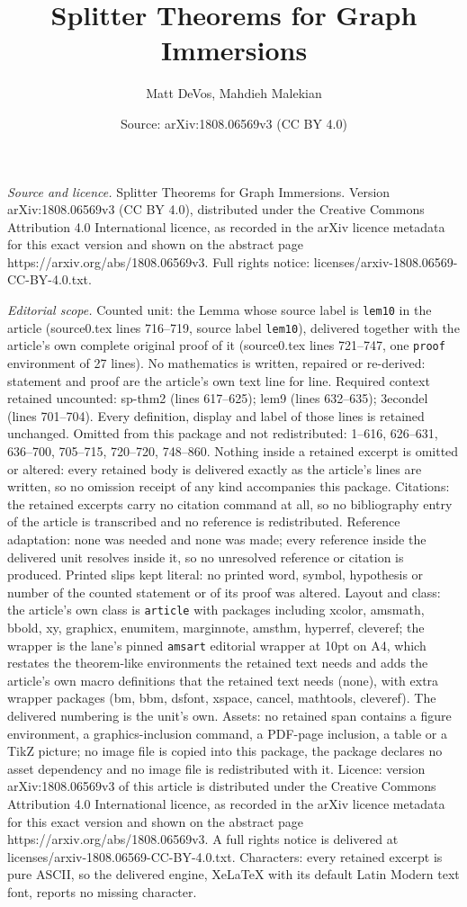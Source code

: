 \documentclass[10pt,a4paper]{amsart}
\title[Splitter Theorems for Graph Immersions]{Splitter Theorems for Graph Immersions}
\author{Matt DeVos, Mahdieh Malekian}
\date{Source: arXiv:1808.06569v3 (CC BY 4.0)}
\begin{document}
\maketitle

\noindent\emph{Source and licence.} Splitter Theorems for Graph Immersions. Version arXiv:1808.06569v3 (CC BY 4.0), distributed under the Creative Commons Attribution 4.0 International licence, as recorded in the arXiv licence metadata for this exact version and shown on the abstract page https://arxiv.org/abs/1808.06569v3. Full rights notice: licenses/arxiv-1808.06569-CC-BY-4.0.txt.\par\smallskip

\noindent\textit{Editorial scope.} Counted unit: the Lemma whose source label is \texttt{lem10} in the article (source0.tex lines 716--719, source label \texttt{lem10}), delivered together with the article's own complete original proof of it (source0.tex lines 721--747, one \texttt{proof} environment of 27 lines). No mathematics is written, repaired or re-derived: statement and proof are the article's own text line for line. Required context retained uncounted: sp-thm2 (lines 617--625); lem9 (lines 632--635); 3econdel (lines 701--704). Every definition, display and label of those lines is retained unchanged. Omitted from this package and not redistributed: 1--616, 626--631, 636--700, 705--715, 720--720, 748--860. Nothing inside a retained excerpt is omitted or altered: every retained body is delivered exactly as the article's lines are written, so no omission receipt of any kind accompanies this package. Citations: the retained excerpts carry no citation command at all, so no bibliography entry of the article is transcribed and no reference is redistributed. Reference adaptation: none was needed and none was made; every reference inside the delivered unit resolves inside it, so no unresolved reference or citation is produced. Printed slips kept literal: no printed word, symbol, hypothesis or number of the counted statement or of its proof was altered. Layout and class: the article's own class is \texttt{article} with packages including xcolor, amsmath, bbold, xy, graphicx, enumitem, marginnote, amsthm, hyperref, cleveref; the wrapper is the lane's pinned \texttt{amsart} editorial wrapper at 10pt on A4, which restates the theorem-like environments the retained text needs and adds the article's own macro definitions that the retained text needs (none), with extra wrapper packages (bm, bbm, dsfont, xspace, cancel, mathtools, cleveref). The delivered numbering is the unit's own. Assets: no retained span contains a figure environment, a graphics-inclusion command, a PDF-page inclusion, a table or a TikZ picture; no image file is copied into this package, the package declares no asset dependency and no image file is redistributed with it. Licence: version arXiv:1808.06569v3 of this article is distributed under the Creative Commons Attribution 4.0 International licence, as recorded in the arXiv licence metadata for this exact version and shown on the abstract page https://arxiv.org/abs/1808.06569v3. A full rights notice is delivered at licenses/arxiv-1808.06569-CC-BY-4.0.txt. Characters: every retained excerpt is pure ASCII, so the delivered engine, XeLaTeX with its default Latin Modern text font, reports no missing character.
\end{document}
